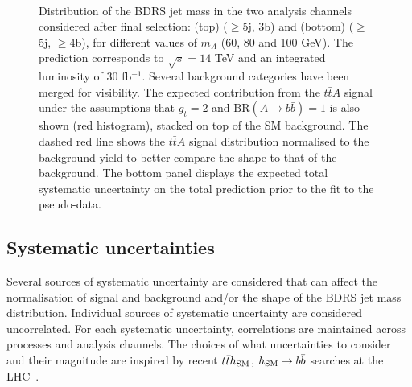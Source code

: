 \documentclass[preprintnumbers,superscriptaddress,nofootinbib,aps,prd,floatfix]{revtex4}
\newcommand{\ttbar}{\ensuremath{t\bar{t}}}
\newcommand{\BR} {\ensuremath{\mathrm{BR}}}
\begin{document}
\begin{figure}[htbp]
\begin{center}
 \\
\caption{\small {Distribution of the BDRS jet mass in the two analysis channels considered after final selection: 
(top) ($\geq$5j, 3b) and (bottom) ($\geq$5j, $\geq$4b), for different values of $m_A$ (60, 80 and 100 GeV).
The prediction corresponds to $\sqrt{s}=14$ TeV and an integrated luminosity of 30 fb$^{-1}$.
Several background categories have been merged for visibility. The expected contribution from 
the $\ttbar A$ signal under the assumptions that $g_t=2$ and $\BR(A\to b\bar{b})=1$  is also shown
(red histogram), stacked on top of the SM background. The dashed red line shows the $\ttbar A$  signal 
distribution normalised to the background yield to better compare the shape to that of the background.
The bottom panel displays the expected total systematic uncertainty on the total prediction prior to the fit 
to the pseudo-data.}}
\label{fig:mA_2} 
\end{center}
\end{figure}

\subsection{Systematic uncertainties}
\label{sec:systematics}

Several sources of systematic uncertainty are considered that can affect the normalisation of signal 
and background and/or the shape of the BDRS jet mass distribution. 
Individual sources of systematic uncertainty are considered uncorrelated.  
For each systematic uncertainty, correlations are maintained across processes and analysis channels. 
The choices of what uncertainties to consider and their magnitude are inspired by recent 
$\ttbar h_{\rm SM}$, $h_{\rm SM}\to b\bar{b}$ searches at the LHC~\cite{Aad:2015gra}.
\end{document}
